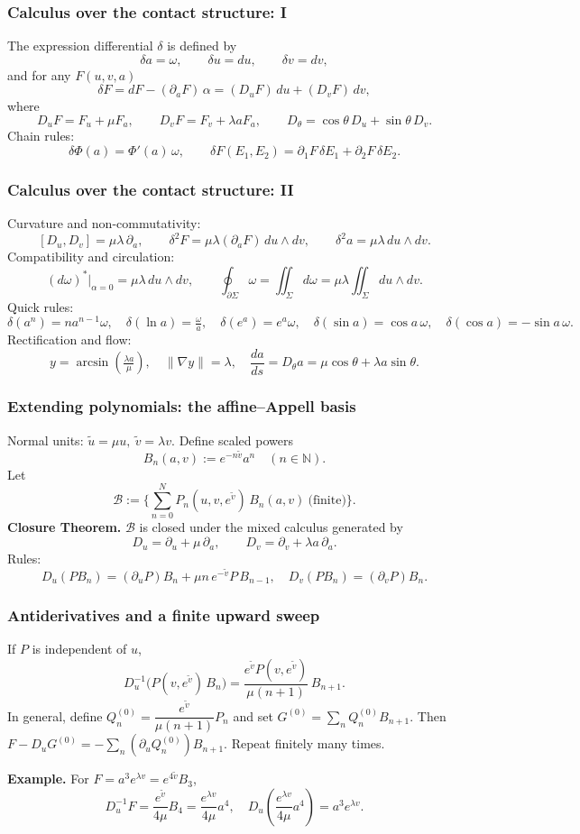 \documentclass[aspectratio=169]{beamer}
\begin{document}
\begin{frame}
    \frametitle{Calculus over the contact structure: I}
    The expression differential $\delta$ is defined by
    \[
      \delta a=\omega,\qquad \delta u=du,\qquad \delta v=dv,
    \]
    and for any $F(u,v,a)$
    \[
      \delta F = dF - (\partial_a F)\,\alpha
      = (D_uF)\,du + (D_vF)\,dv,
    \]
    where
    \[
      D_uF=F_u+\mu F_a,\qquad D_vF=F_v+\lambda a F_a,\qquad
      D_\theta=\cos\theta\,D_u+\sin\theta\,D_v.
    \]
    Chain rules:
    \[
      \delta\Phi(a)=\Phi'(a)\,\omega,\qquad
      \delta F(E_1,E_2)=\partial_1F\,\delta E_1+\partial_2F\,\delta E_2.
    \]
\end{frame}

\begin{frame}
    \frametitle{Calculus over the contact structure: II}
    Curvature and non-commutativity:
    \[
      [D_u,D_v]=\mu\lambda\,\partial_a,\qquad
      \delta^2F=\mu\lambda(\partial_a F)\,du\wedge dv,\qquad
      \delta^2 a=\mu\lambda\,du\wedge dv.
    \]
    Compatibility and circulation:
    \[
      (d\omega)^*\big|_{\alpha=0}=\mu\lambda\,du\wedge dv,\qquad
      \oint_{\partial\Sigma}\omega=\iint_\Sigma d\omega=\mu\lambda\iint_\Sigma du\wedge dv.
    \]
    Quick rules:
    \[
      \delta(a^n)=n a^{n-1}\omega,\quad
      \delta(\ln a)=\tfrac{\omega}{a},\quad
      \delta(e^a)=e^a\omega,\quad
      \delta(\sin a)=\cos a\,\omega,\quad
      \delta(\cos a)=-\sin a\,\omega.
    \]
    Rectification and flow:
    \[
      y=\arcsin\!\left(\tfrac{\lambda a}{\mu}\right),\quad \|\nabla y\|=\lambda,\quad
      \frac{da}{ds}=D_\theta a=\mu\cos\theta+\lambda a\sin\theta.
    \]
\end{frame}

\begin{frame}
  \frametitle{Extending polynomials: the affine–Appell basis}
  Normal units: $\tilde u=\mu u,\ \tilde v=\lambda v$. Define scaled powers
  \[
    B_n(a,v):=e^{-n\tilde v}a^n\quad(n\in\mathbb{N}).
  \]
  Let
  \[
    \mathcal{B}:=\Big\{\sum_{n=0}^N P_n(u,v,e^{\tilde v})\,B_n(a,v)\ \text{(finite)}\Big\}.
  \]
  \textbf{Closure Theorem.} $\mathcal{B}$ is closed under the mixed calculus generated by
  \[
    D_u=\partial_u+\mu\,\partial_a,\qquad D_v=\partial_v+\lambda a\,\partial_a.
  \]
  Rules:
  \[
    D_u(PB_n)=(\partial_u P)B_n+\mu n\,e^{-\tilde v}P\,B_{n-1},\quad
    D_v(PB_n)=(\partial_v P)B_n.
  \]
\end{frame}

\begin{frame}
  \frametitle{Antiderivatives and a finite upward sweep}
  If $P$ is independent of $u$,
  \[
    D_u^{-1}\!\big(P(v,e^{\tilde v})\,B_n\big)=\frac{e^{\tilde v}P(v,e^{\tilde v})}{\mu(n+1)}\,B_{n+1}.
  \]
  In general, define $Q^{(0)}_n=\dfrac{e^{\tilde v}}{\mu(n+1)}P_n$ and set $G^{(0)}=\sum_n Q^{(0)}_nB_{n+1}$.
  Then $F-\!D_uG^{(0)}=-\sum_n(\partial_uQ^{(0)}_n)B_{n+1}$. Repeat finitely many times.
  \vspace{0.6em}

  \textbf{Example.} For $F=a^3e^{\lambda v}=e^{4\tilde v}B_3$,
  \[
    D_u^{-1}F=\frac{e^{\tilde v}}{4\mu}B_4=\frac{e^{\lambda v}}{4\mu}a^4,\quad
    D_u\!\left(\frac{e^{\lambda v}}{4\mu}a^4\right)=a^3e^{\lambda v}.
  \]
\end{frame}
\end{document}
